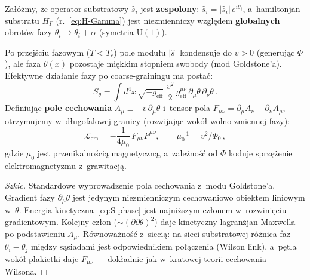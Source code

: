 \begin{proposition}%
\label{prop:U1-emergence}
Za\l{}\'o\.zmy, \.ze operator substratowy $\hat{s}_i$ jest
\textbf{zespolony}: $\hat{s}_i = |\hat{s}_i|\,e^{i\theta_i}$,
a~hamiltonjan substratu $H_\Gamma$ (r.~\eqref{eq:H-Gamma})
jest niezmienniczy wzgl\k{e}dem \textbf{globalnych} obrot\'ow
fazy $\theta_i \to \theta_i + \alpha$ (symetria $\mathrm{U}(1)$).

Po przej\'sciu fazowym ($T < T_c$) pole modu\l{}u
$|\hat{s}|$ kondensuje do $v > 0$ (generuj\k{a}c $\Phi$),
ale faza $\theta(x)$ pozostaje mi\k{e}kkim stopniem swobody
(mod Goldstone'a). Efektywne dzia\l{}anie fazy
po coarse-grainingu ma posta\'c:
\begin{equation}\label{eq:S-phase}
  S_\theta = \int d^4x\,\sqrt{-g_{\mathrm{eff}}}\;
  \frac{v^2}{2}\,g_{\mathrm{eff}}^{\mu\nu}\,
  \partial_\mu\theta\,\partial_\nu\theta\,.
\end{equation}
Definiuj\k{a}c \textbf{pole cechowania}
$A_\mu \equiv -v\,\partial_\mu\theta$ i~tensor pola
$F_{\mu\nu} = \partial_\mu A_\nu - \partial_\nu A_\mu$,
otrzymujemy w~d\l{}ugofalowej granicy
(rozwijaj\k{a}c wok\'o\l{} wolno zmiennej fazy):
\begin{equation}\label{eq:L-Maxwell-emergent}
  \mathcal{L}_{\mathrm{em}} =
  -\frac{1}{4\mu_0}\,F_{\mu\nu}F^{\mu\nu},
  \qquad
  \mu_0^{-1} = v^2/\Phi_0\,,
\end{equation}
gdzie $\mu_0$ jest przenikalno\'sci\k{a} magnetyczn\k{a},
a~zale\.zno\'s\'c od $\Phi$ koduje sprz\k{e}\.zenie
elektromagnetyzmu z~grawitacj\k{a}.
\end{proposition}

\begin{proof}[Szkic]
Standardowe wyprowadzenie pola cechowania z~modu Goldstone'a.
Gradient fazy $\partial_\mu\theta$ jest jedynym niezmienniczym
cechowaniowo obiektem liniowym w~$\theta$.
Energia kinetyczna~\eqref{eq:S-phase} jest najni\.zszym
cz\l{}onem w~rozwini\k{e}ciu gradientowym.
Kolejny cz\l{}on ($\sim (\partial\partial\theta)^2$) daje
kinetyczny lagran\.zjan Maxwella po podstawieniu $A_\mu$.
R\'ownowa\.zno\'s\'c z~sieci\k{a}: na sieci substratowej
r\'o\.znica faz $\theta_i - \theta_j$ mi\k{e}dzy s\k{a}siadami
jest odpowiednikiem po\l{}\k{a}czenia (Wilson link),
a~p\k{e}tla wok\'o\l{} plakietki daje $F_{\mu\nu}$
--- dok\l{}adnie jak w~kratowej teorii cechowania Wilsona.
\end{proof}

